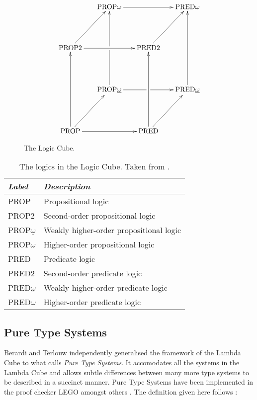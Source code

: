 \documentclass[12pt,toc=bibliography,numbers=noendperiod,
               footnotes=multiple,twoside]{scrartcl}
\begin{document}
\begin{figure}
\begin{equation*}
\xymatrix@R46pt@C16pt{%
&\textrm{PROP}\omega\ar@{->}[rr]&&\textrm{PRED}\omega \\
\textrm{PROP2}\ar@{->}[rr]\ar@{->}[ur]&&\textrm{PRED2}\ar@{->}[ur] \\
&\textrm{PROP}\underline{\omega}\ar@{->}[uu]|!{"2,1";"2,3"}\hole\ar@{->}[rr]|!{"4,3";"2,3"}\hole&&\textrm{PRED}\underline{\omega}\ar@{->}[uu] \\
\textrm{PROP}\ar@{->}[uu]\ar@{->}[rr]\ar@{->}[ur]&&\textrm{PRED}\ar@{->}[uu]\ar@{->}[ur]
}
\end{equation*}
\caption{The Logic Cube.}
\label{fig:l-cube}
\end{figure}

\begin{table}[h]
    \centering
    \begin{tabular}{l l}
        \toprule
        \textit{Label} & \textit{Description} \\
        \midrule
        PROP & Propositional logic \\
        PROP2 & Second-order propositional logic \\
        PROP\(\underline{\omega}\) & Weakly higher-order propositional logic \\
        PROP\(\omega\) & Higher-order propositional logic \\
        PRED & Predicate logic \\
        PRED2 & Second-order predicate logic \\
        PRED\(\underline{\omega}\) & Weakly higher-order predicate logic \\
        PRED\(\omega\) & Higher-order predicate logic \\
        \bottomrule
    \end{tabular}
    \caption{The logics in the Logic Cube. Taken from \textcite[248]{barendregt_lambda_1992}.}
    \label{tab:l-cube-names}
\end{table}


\subsection{\label{ssc:pts}Pure Type Systems}

Berardi and Terlouw independently generalised the framework of the Lambda Cube to what \textcite{barendregt_lambda_1992} calls \emph{Pure Type Systems}. It accomodates all the systems in the Lambda Cube and allows subtle differences between many more type systems to be described in a succinct manner. Pure Type Systems have been implemented in the proof checker LEGO amongst others \autocite{pollack_theory_1994}. The definition given here follows \textcite[213f.]{barendregt_lambda_1992}:
\end{document}
